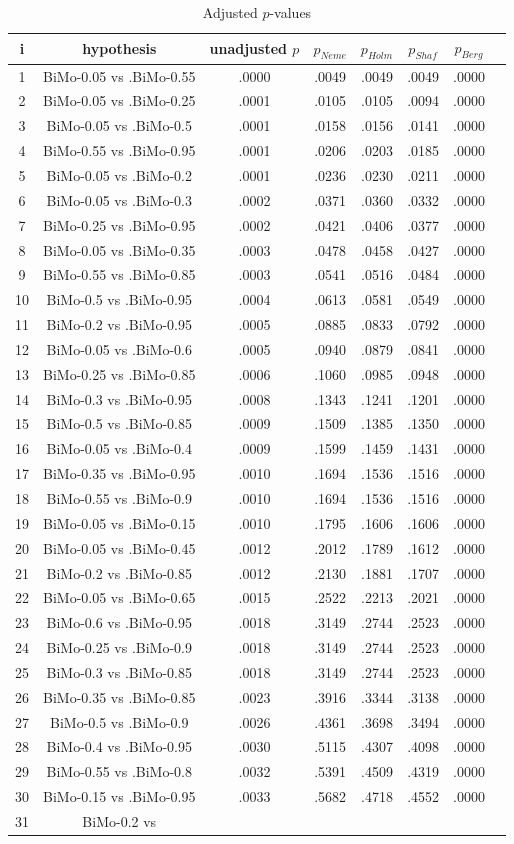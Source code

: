 \documentclass[a4paper,10pt]{article}
\begin{document}
\begin{landscape}
\begin{table}[!htp]
\centering\tiny
\caption{Adjusted $p$-values}
\begin{tabular}{cccccccc}
i&hypothesis&unadjusted $p$&$p_{Neme}$&$p_{Holm}$&$p_{Shaf}$&$p_{Berg}$\\
\hline
1&BiMo-0.05 vs .BiMo-0.55&.0000&.0049&.0049&.0049&.0000\\2&BiMo-0.05 vs .BiMo-0.25&.0001&.0105&.0105&.0094&.0000\\3&BiMo-0.05 vs .BiMo-0.5&.0001&.0158&.0156&.0141&.0000\\4&BiMo-0.55 vs .BiMo-0.95&.0001&.0206&.0203&.0185&.0000\\5&BiMo-0.05 vs .BiMo-0.2&.0001&.0236&.0230&.0211&.0000\\6&BiMo-0.05 vs .BiMo-0.3&.0002&.0371&.0360&.0332&.0000\\7&BiMo-0.25 vs .BiMo-0.95&.0002&.0421&.0406&.0377&.0000\\8&BiMo-0.05 vs .BiMo-0.35&.0003&.0478&.0458&.0427&.0000\\9&BiMo-0.55 vs .BiMo-0.85&.0003&.0541&.0516&.0484&.0000\\10&BiMo-0.5 vs .BiMo-0.95&.0004&.0613&.0581&.0549&.0000\\11&BiMo-0.2 vs .BiMo-0.95&.0005&.0885&.0833&.0792&.0000\\12&BiMo-0.05 vs .BiMo-0.6&.0005&.0940&.0879&.0841&.0000\\13&BiMo-0.25 vs .BiMo-0.85&.0006&.1060&.0985&.0948&.0000\\14&BiMo-0.3 vs .BiMo-0.95&.0008&.1343&.1241&.1201&.0000\\15&BiMo-0.5 vs .BiMo-0.85&.0009&.1509&.1385&.1350&.0000\\16&BiMo-0.05 vs .BiMo-0.4&.0009&.1599&.1459&.1431&.0000\\17&BiMo-0.35 vs .BiMo-0.95&.0010&.1694&.1536&.1516&.0000\\18&BiMo-0.55 vs .BiMo-0.9&.0010&.1694&.1536&.1516&.0000\\19&BiMo-0.05 vs .BiMo-0.15&.0010&.1795&.1606&.1606&.0000\\20&BiMo-0.05 vs .BiMo-0.45&.0012&.2012&.1789&.1612&.0000\\21&BiMo-0.2 vs .BiMo-0.85&.0012&.2130&.1881&.1707&.0000\\22&BiMo-0.05 vs .BiMo-0.65&.0015&.2522&.2213&.2021&.0000\\23&BiMo-0.6 vs .BiMo-0.95&.0018&.3149&.2744&.2523&.0000\\24&BiMo-0.25 vs .BiMo-0.9&.0018&.3149&.2744&.2523&.0000\\25&BiMo-0.3 vs .BiMo-0.85&.0018&.3149&.2744&.2523&.0000\\26&BiMo-0.35 vs .BiMo-0.85&.0023&.3916&.3344&.3138&.0000\\27&BiMo-0.5 vs .BiMo-0.9&.0026&.4361&.3698&.3494&.0000\\28&BiMo-0.4 vs .BiMo-0.95&.0030&.5115&.4307&.4098&.0000\\29&BiMo-0.55 vs .BiMo-0.8&.0032&.5391&.4509&.4319&.0000\\30&BiMo-0.15 vs .BiMo-0.95&.0033&.5682&.4718&.4552&.0000\\31&BiMo-0.2 vs 
\end{tabular}
\end{table}
\end{landscape}
\end{document}
